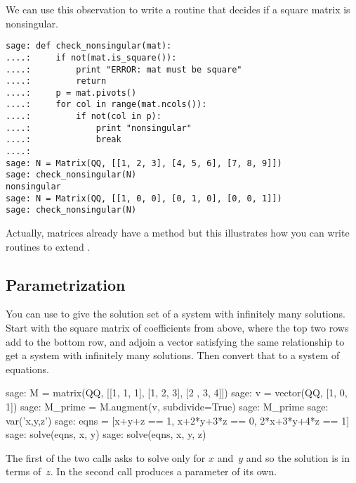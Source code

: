 We can use this observation to write a routine that decides if a 
square matrix is nonsingular.
         
\begin{lstlisting}
sage: def check_nonsingular(mat):
....:     if not(mat.is_square()):
....:         print "ERROR: mat must be square"
....:         return
....:     p = mat.pivots()
....:     for col in range(mat.ncols()):
....:         if not(col in p):
....:             print "nonsingular"
....:             break
....:          
sage: N = Matrix(QQ, [[1, 2, 3], [4, 5, 6], [7, 8, 9]])
sage: check_nonsingular(N)                                
nonsingular
sage: N = Matrix(QQ, [[1, 0, 0], [0, 1, 0], [0, 0, 1]])
sage: check_nonsingular(N)                                   
\end{lstlisting}
\noindent
Actually, \Sage{} matrices already have a method 
but this illustrates how you can write routines to extend \Sage.






\subsection{Parametrization}
You can use  to give the solution set of a system
with infinitely many solutions.
Start with the square matrix of coefficients from above,
where the top two rows add to the bottom row,
and adjoin a vector satisfying the same relationship to get
a system with infinitely many solutions.
Then convert that to a system of equations.
\begin{sagecommandline}
sage: M = matrix(QQ, [[1, 1, 1], [1, 2, 3], [2 , 3, 4]])    
sage: v = vector(QQ, [1, 0, 1])                            
sage: M_prime = M.augment(v, subdivide=True)               
sage: M_prime
sage: var('x,y,z')          
sage: eqns = [x+y+z == 1, x+2*y+3*z == 0, 2*x+3*y+4*z == 1]
sage: solve(eqns, x, y)   
sage: solve(eqns, x, y, z)                                 
\end{sagecommandline}
The first of the two  calls asks \Sage{} 
to solve only for $x$ and~$y$ and so the solution is in terms of~$z$.
In the second call \Sage{} produces a parameter of its own.   




